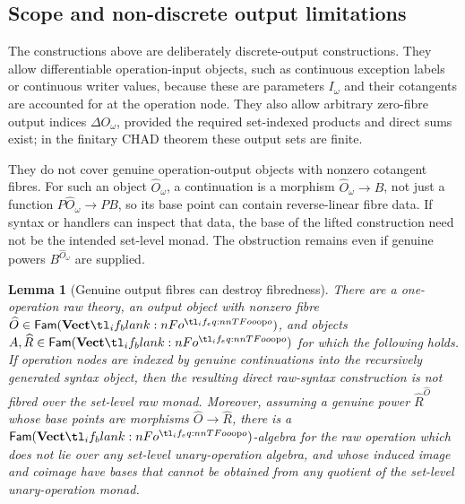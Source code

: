 \documentclass[11pt,a4paper]{article}
\newtheorem{lemma}[theorem]{Lemma}
\theoremstyle{definition}
\theoremstyle{remark}
\providecommand{\Fam}[1]{\mathsf{Fam}(#1)}
\begin{document}
\subsection{Scope and non-discrete output limitations}
\label{sec:appendix-additional-effects-scope}

The constructions above are deliberately discrete-output constructions. They
allow differentiable operation-input objects, such as continuous exception
labels or continuous writer values, because these are parameters
\(I_{\omega}\) and their cotangents are accounted for at the operation node.
They also allow arbitrary zero-fibre output indices \(\Delta O_{\omega}\),
provided the required set-indexed products and direct sums exist; in the
finitary CHAD theorem these output sets are finite.

They do not cover genuine operation-output objects with nonzero cotangent
fibres. For such an object \(\widehat O_{\omega}\), a continuation is a
morphism \(\widehat O_{\omega}\to B\), not just a function
\(P\widehat O_{\omega}\to PB\), so its base point can contain reverse-linear
fibre data. If syntax or handlers can inspect that data, the base of the lifted
construction need not be the intended set-level monad. The obstruction remains
even if genuine powers \(B^{\widehat O_{\omega}}\) are supplied.

\begin{lemma}[Genuine output fibres can destroy fibredness]
  \label{lem:appendix-nondiscrete-output-not-fibred}
  There are a one-operation raw theory, an output object with nonzero fibre
  \(\widehat O\in\Fam{\Vect[o]}\), and objects
  \(A,\widehat R\in\Fam{\Vect[o]}\) for which the following holds.
  If operation nodes are indexed by genuine continuations into the recursively
  generated syntax object, then the resulting direct raw-syntax construction is
  not fibred over the set-level raw monad. Moreover, assuming a genuine power
  \(\widehat R^{\widehat O}\) whose base points are morphisms
  \(\widehat O\to\widehat R\), there is a \(\Fam{\Vect[o]}\)-algebra
  for the raw operation which does not lie over any set-level unary-operation
  algebra, and whose induced image and coimage have bases that cannot be
  obtained from any quotient of the set-level unary-operation monad.
\end{lemma}
\end{document}
